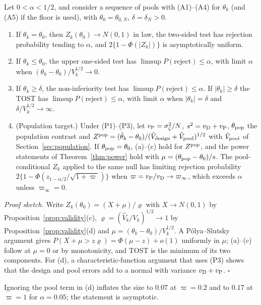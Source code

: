 \begin{theorem}[Size]\label{thm:size}
Let $0<\alpha<1/2$, and consider a sequence of pools with (A1)--(A4) for $\theta_k$ (and (A5) if the floor is used), with $\theta_0=\theta_{0,N}$, $\delta=\delta_N>0$.
\begin{enumerate}
\item[(a)] If $\theta_k=\theta_0$, then $Z_k(\theta_0)\to N(0,1)$ in law, the two-sided test has rejection probability tending to $\alpha$, and $2\{1-\Phi(|Z_k|)\}$ is asymptotically uniform.
\item[(b)] If $\theta_k\le\theta_0$, the upper one-sided test has $\limsup P(\text{reject})\le\alpha$, with limit $\alpha$ when $(\theta_k-\theta_0)/V_k^{1/2}\to0$.
\item[(c)] If $\theta_k\ge\delta$, the non-inferiority test has $\limsup P(\text{reject})\le\alpha$. If $|\theta_k|\ge\delta$ the TOST has $\limsup P(\text{reject})\le\alpha$, with limit $\alpha$ when $|\theta_k|=\delta$ and $\delta/V_k^{1/2}\to\infty$.
\item[(d)] (Population target.) Under (P1)--(P3), let $v_{\rm P}=\sigma^2_\zeta/N$, $s^2=v_{\rm D}+v_{\rm P}$, $\theta_{\rm pop}$ the population contrast and $Z^{\rm pop}=(\hat\theta_k-\theta_0)/(\hat V_{\rm design}+\hat V_{\rm pool})^{1/2}$ with $\hat V_{\rm pool}$ of Section~\ref{sec:population}. If $\theta_{\rm pop}=\theta_0$, (a)--(c) hold for $Z^{\rm pop}$, and the power statements of Theorem~\ref{thm:power} hold with $\mu=(\theta_{\rm pop}-\theta_0)/s$. The pool-conditional $Z_k$ applied to the same null has limiting rejection probability $2\{1-\Phi(z_{1-\alpha/2}/\sqrt{1+\varpi})\}$ when $\varpi=v_{\rm P}/v_{\rm D}\to\varpi_\infty$, which exceeds $\alpha$ unless $\varpi_\infty=0$.
\end{enumerate}
\end{theorem}

\emph{Proof sketch.} Write $Z_k(\theta_0)=(X+\mu)/\varrho$ with $X\to N(0,1)$ by Proposition~\ref{prop:validity}(c), $\varrho=(\hat V_k/V_k)^{1/2}\to1$ by Proposition~\ref{prop:validity}(d) and $\mu=(\theta_k-\theta_0)/V_k^{1/2}$. A P\'olya--Slutsky argument gives $P(X+\mu>z\varrho)=\Phi(\mu-z)+o(1)$ uniformly in $\mu$; (a)--(c) follow at $\mu=0$ or by monotonicity, and TOST is the minimum of its two components. For (d), a characteristic-function argument that uses (P3) shows that the design and pool errors add to a normal with variance $v_{\rm D}+v_{\rm P}$. $\square$

Ignoring the pool term in (d) inflates the size to $0.07$ at $\varpi=0.2$ and to $0.17$ at $\varpi=1$ for $\alpha=0.05$; the statement is asymptotic.

